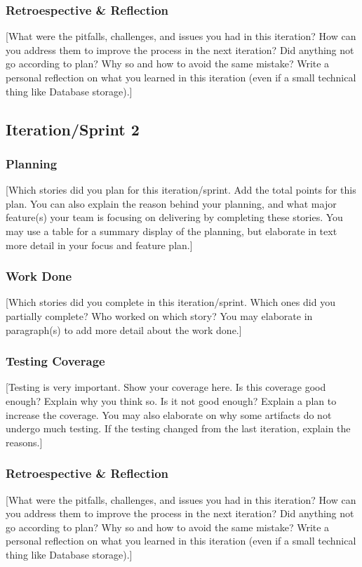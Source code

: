 \documentclass{article}
\begin{document}
\subsubsection{Retroespective \& Reflection}
[What were the pitfalls, challenges, and issues you had in this iteration? How can you address them to improve the process in the next iteration? Did anything not go according to plan? Why so and how to avoid the same mistake? Write a personal reflection on what you learned in this iteration (even if a small technical thing like Database storage).]


\subsection{Iteration/Sprint 2}
\subsubsection{Planning}
[Which stories did you plan for this iteration/sprint. Add the total points for this plan. You can also explain the reason behind your planning, and what major feature(s) your team is focusing on delivering by completing these stories. You may use a table for a summary display of the planning, but elaborate in text more detail in your focus and feature plan.]

\subsubsection{Work Done}
[Which stories did you complete in this iteration/sprint. Which ones did you partially complete? Who worked on which story? You may elaborate in paragraph(s) to add more detail about the work done.]

\subsubsection{Testing Coverage}
[Testing is very important. Show your coverage here. Is this coverage good enough? Explain why you think so. Is it not good enough? Explain a plan to increase the coverage. You may also elaborate on why some artifacts do not undergo much testing. If the testing changed from the last iteration, explain the reasons.]

\subsubsection{Retroespective \& Reflection}
[What were the pitfalls, challenges, and issues you had in this iteration? How can you address them to improve the process in the next iteration? Did anything not go according to plan? Why so and how to avoid the same mistake? Write a personal reflection on what you learned in this iteration (even if a small technical thing like Database storage).]
\end{document}
